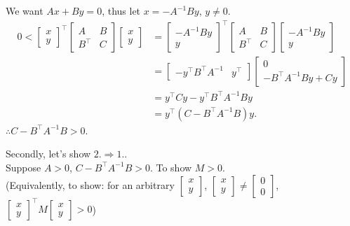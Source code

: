 \documentclass[letterpaper]{article}
\begin{document}
		We want $Ax+By=0$, thus let $x=- A^{-1} B y$, $y \neq 0$.
		\begin{align*}		
            0 < 	\begin{bmatrix} x \\ y \end{bmatrix} ^\top \begin{bmatrix} A & B \\	B^\top & C \end{bmatrix}
			\begin{bmatrix} x \\ y \end{bmatrix}
			&= 	\begin{bmatrix} -A^{-1}By \\ y \end{bmatrix} ^\top
			\begin{bmatrix} A & B \\ 	B^\top & C	\end{bmatrix}
			\begin{bmatrix} -A^{-1}By \\ y \end{bmatrix} \\
			&= \begin{bmatrix} -y^\top B^\top A^{-1} &  y^\top \end{bmatrix}
			\begin{bmatrix} 0 \\ -B^\top A^{-1} B y+ Cy \end{bmatrix} \\
			&= y^\top Cy - y^\top B^\top A^{-1} By\\
			&= y^\top ( C - B^\top A^{-1} B )y.
		\end{align*}
		$ \therefore C-B^\top A^{-1} B > 0 $.

		Secondly, let's show $2. \Rightarrow 1.$.\\
		Suppose $A>0$, $C- B^\top A^{-1} B > 0$. To show $M>0$.\\
		(Equivalently, to show: for an arbitrary $\begin{bmatrix} x \\ y \end{bmatrix}$,
		$\begin{bmatrix} x \\ y \end{bmatrix} \neq \begin{bmatrix} 0 \\ 0 \end{bmatrix}$,
		$\begin{bmatrix} x \\ y \end{bmatrix}^\top M \begin{bmatrix} x \\ y \end{bmatrix} > 0$)
\end{document}
